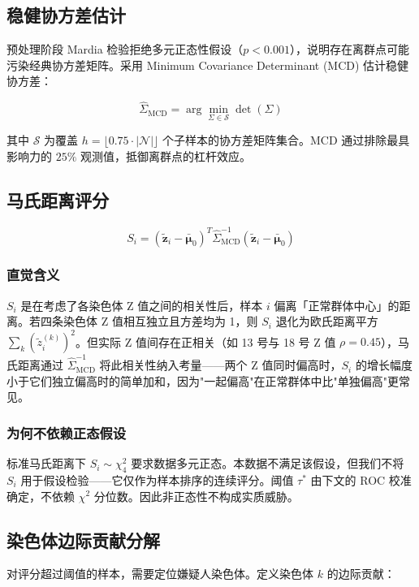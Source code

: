 \documentclass[UTF8]{ctexart}
\begin{document}
\subsection{稳健协方差估计}

预处理阶段 Mardia 检验拒绝多元正态性假设（$p < 0.001$），说明存在离群点可能污染经典协方差矩阵。采用 Minimum Covariance Determinant (MCD) 估计稳健协方差：

\[
\hat{\Sigma}_{\text{MCD}} = \arg\min_{\Sigma \in \mathcal{S}} \det(\Sigma)
\]

其中 $\mathcal{S}$ 为覆盖 $h = \lfloor 0.75 \cdot |\mathcal{N}| \rfloor$ 个子样本的协方差矩阵集合。MCD 通过排除最具影响力的 $25\%$ 观测值，抵御离群点的杠杆效应。

\subsection{马氏距离评分}

\[
S_i = (\tilde{\mathbf{z}}_i - \bar{\boldsymbol{\mu}}_0)^T \hat{\Sigma}_{\text{MCD}}^{-1} (\tilde{\mathbf{z}}_i - \bar{\boldsymbol{\mu}}_0)
\]

\subsubsection{直觉含义}

$S_i$ 是在考虑了各染色体 Z 值之间的相关性后，样本 $i$ 偏离「正常群体中心」的距离。若四条染色体 Z 值相互独立且方差均为 1，则 $S_i$ 退化为欧氏距离平方 $\sum_k (\tilde{z}_i^{(k)})^2$。但实际 Z 值间存在正相关（如 13 号与 18 号 Z 值 $\rho=0.45$），马氏距离通过 $\hat{\Sigma}_{\text{MCD}}^{-1}$ 将此相关性纳入考量——两个 Z 值同时偏高时，$S_i$ 的增长幅度小于它们独立偏高时的简单加和，因为"一起偏高"在正常群体中比"单独偏高"更常见。

\subsubsection{为何不依赖正态假设}

标准马氏距离下 $S_i \sim \chi^2_4$ 要求数据多元正态。本数据不满足该假设，但我们不将 $S_i$ 用于假设检验——它仅作为样本排序的连续评分。阈值 $\tau^*$ 由下文的 ROC 校准确定，不依赖 $\chi^2$ 分位数。因此非正态性不构成实质威胁。

\subsection{染色体边际贡献分解}

对评分超过阈值的样本，需要定位嫌疑人染色体。定义染色体 $k$ 的边际贡献：
\end{document}
